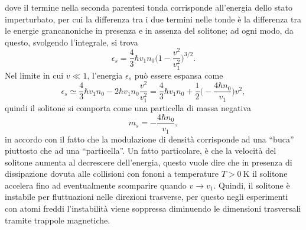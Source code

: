 dove il termine nella seconda parentesi tonda corrisponde all'energia dello stato imperturbato, per cui la differenza tra i due termini nelle tonde è la differenza tra le energie grancanoniche in presenza e in assenza del solitone; ad ogni modo, da questo, svolgendo l'integrale, si trova
\begin{equation}
    \epsilon_s = \frac{4}{3}\hbar v_1n_0\bigg( 1 - \frac{v^2}{v_1^2}\bigg)^{3/2}.
\end{equation}
Nel limite in cui $v \ll 1$, l'energia $\epsilon_s$ può essere espansa come
\begin{equation}
    \epsilon_s \simeq \frac{4}{3}\hbar v_1 n_0 - 2\hbar v_1 n_0 \frac{v^2}{v_1^2} = \frac{4}{3}\hbar v_1 n_0 + \frac{1}{2}\bigg(-\frac{4\hbar n_0}{v_1}\bigg)v^2,
\end{equation}
quindi il solitone si comporta come una particella di massa negativa
\begin{equation}
    m_s = -\frac{4\hbar n_0}{v_1},
\end{equation}
in accordo con il fatto che la modulazione di densità corrisponde ad una ``buca'' piuttosto che ad una ``particella''. Un fatto particolare, è che la velocità del solitone aumenta al decrescere dell'energia, questo vuole dire che in presenza di dissipazione dovuta alle collisioni con fononi a temperature $T > \SI{0}{\kelvin}$ il solitone accelera fino ad eventualmente scomparire quando $v \to v_1$. Quindi, il solitone è instabile per fluttuazioni nelle direzioni trasverse, per questo negli esperimenti con atomi freddi l'instabilità viene soppressa diminuendo le dimensioni trasversali tramite trappole magnetiche.

